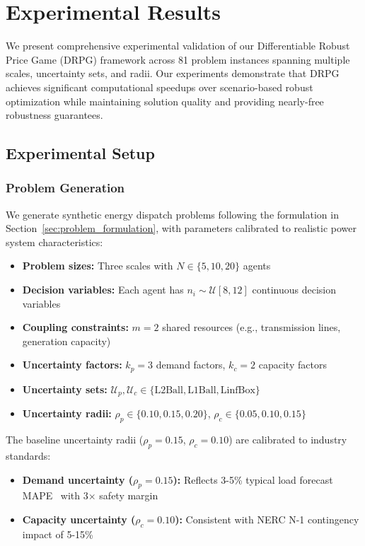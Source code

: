 \section{Experimental Results}
\label{sec:experimental_results}

We present comprehensive experimental validation of our Differentiable Robust Price Game (DRPG) framework across 81 problem instances spanning multiple scales, uncertainty sets, and radii. Our experiments demonstrate that DRPG achieves significant computational speedups over scenario-based robust optimization while maintaining solution quality and providing nearly-free robustness guarantees.

\subsection{Experimental Setup}
\label{sec:experimental_setup}

\subsubsection{Problem Generation}

We generate synthetic energy dispatch problems following the formulation in Section~\ref{sec:problem_formulation}, with parameters calibrated to realistic power system characteristics:

\begin{itemize}
    \item \textbf{Problem sizes:} Three scales with $N \in \{5, 10, 20\}$ agents
    \item \textbf{Decision variables:} Each agent has $n_i \sim \mathcal{U}[8, 12]$ continuous decision variables
    \item \textbf{Coupling constraints:} $m = 2$ shared resources (e.g., transmission lines, generation capacity)
    \item \textbf{Uncertainty factors:} $k_p = 3$ demand factors, $k_c = 2$ capacity factors
    \item \textbf{Uncertainty sets:} $\mathcal{U}_p, \mathcal{U}_c \in \{\text{L2Ball}, \text{L1Ball}, \text{LinfBox}\}$
    \item \textbf{Uncertainty radii:} $\rho_p \in \{0.10, 0.15, 0.20\}$, $\rho_c \in \{0.05, 0.10, 0.15\}$
\end{itemize}

The baseline uncertainty radii ($\rho_p = 0.15$, $\rho_c = 0.10$) are calibrated to industry standards:
\begin{itemize}
    \item \textbf{Demand uncertainty ($\rho_p = 0.15$):} Reflects 3-5\% typical load forecast MAPE~\cite{IEEE762} with 3$\times$ safety margin
    \item \textbf{Capacity uncertainty ($\rho_c = 0.10$):} Consistent with NERC N-1 contingency impact of 5-15\%~\cite{NERC_Standard}
\end{itemize}

